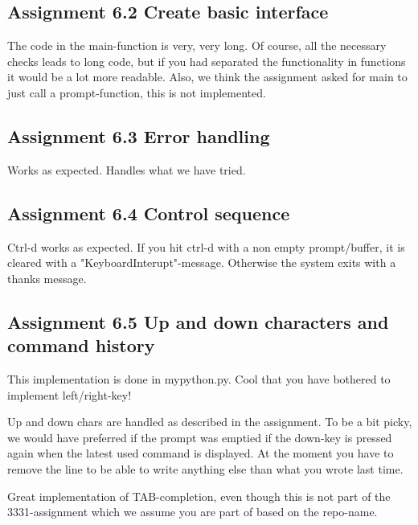 \documentclass[a4paper]{article}
\begin{document}
\subsection*{Assignment 6.2 Create basic interface} \label{sec:assignment5.2}

\begin{flushleft}
The code in the main-function is very, very long. Of course, all the necessary checks leads to long code, but if you had separated the functionality in functions it would be a lot more readable. Also, we think the assignment asked for main to just call a prompt-function, this is not implemented.
\end{flushleft}

\subsection*{Assignment 6.3 Error handling}

\begin{flushleft}
Works as expected.
Handles what we have tried.
\end{flushleft}

\subsection*{Assignment 6.4 Control sequence}

\begin{flushleft}
Ctrl-d works as expected. If you hit ctrl-d with a non empty prompt/buffer, it is cleared with a "KeyboardInterupt"-message. Otherwise the system exits with a thanks message.
\end{flushleft}

\subsection*{Assignment 6.5 Up and down characters and command history}

\begin{flushleft}
This implementation is done in mypython.py. Cool that you have bothered to implement left/right-key! \newline

Up and down chars are handled as described in the assignment. To be a bit picky, we would have preferred if the prompt was emptied if the down-key is pressed again when the latest used command is displayed. At the moment you have to remove the line to be able to write anything else than what you wrote last time.\newline

Great implementation of TAB-completion, even though this is not part of the 3331-assignment which we assume you are part of based on the repo-name.
\end{flushleft}
\end{document}
